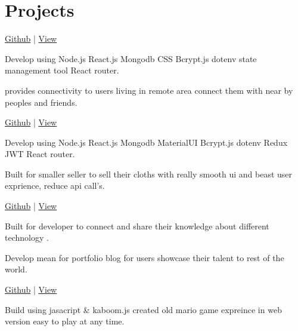 \documentclass[]{deedy-resume-openfont}
\begin{document}
\begin{minipage}[t]{0.66\textwidth}

\section{Projects}
\href{https://github.com/Ajeetbisht/social}{Github} |
\href{https://github.com/Ajeetbisht/social}{View} \\
\begin{tightemize}
\item Develop using Node.js React.js Mongodb CSS Bcrypt.js dotenv state management tool React router.
\item provides connectivity to users living in remote area connect them with near by peoples and friends.
\end{tightemize}
\sectionsep

\href{https://github.com/Ajeetbisht/Ecommerce}{Github} |
\href{https://github.com/Ajeetbisht/Ecommerce}{View} \\
\begin{tightemize}
\item Develop using Node.js React.js Mongodb MaterialUI Bcrypt.js dotenv Redux JWT React router.
\item Built for smaller seller to sell their cloths with really smooth ui and beast user exprience, reduce api call's.
\end{tightemize}
\sectionsep

\href{https://github.com/Ajeetbisht/node_dev}{Github} |
\href{https://github.com/Ajeetbisht/node_dev}{View} \\
\begin{tightemize}
\item Built for developer to connect and share their knowledge about different technology .
\item Develop mean for portfolio blog for users showcase their talent to rest of the world.
\end{tightemize}
\sectionsep

\href{https://github.com/Ajeetbisht/Game}{Github} |
\href{https://github.com/Ajeetbisht/Game}{View} \\
\begin{tightemize}
\item Build using jasacript & kaboom.js created old mario game expreince in web version easy to play at any time.
\end{tightemize}
\sectionsep


\end{minipage}
\end{document}
